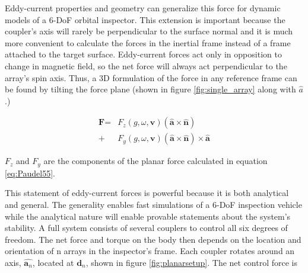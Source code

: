 \documentclass[letterpaper, 10 pt, conference]{ieeeconf}  %
\begin{document}
\par Eddy-current properties and geometry can generalize this force for dynamic models of a 6-DoF orbital inspector. This extension is important because the coupler's axis will rarely be perpendicular to the surface normal and it is much more convenient to calculate the forces in the inertial frame instead of a frame attached to the target surface. 
Eddy-current forces act only in opposition to change in magnetic field, so the net force will always act perpendicular to the array's spin axis. Thus, a 3D formulation of the force in any reference frame can be found by tilting the force plane (shown in figure \ref{fig:single_array} along with $\hat{a}$.) 


\begin{equation}
\label{eq:arrayForce}
\begin{split}
\textbf{F} =  &F_z(g,\omega,\textbf{v}) \left(\hat{\textbf{a}} \times \hat{\textbf{n}} \right) \\
			 + &F_y(g,\omega,\textbf{v}) \left(\hat{\textbf{a}} \times \hat{\textbf{n}} \right) \times \hat{\textbf{a}}
 \end{split}
 \end{equation}
 
 $F_z$ and $F_y$ are the components of the planar force calculated in equation \ref{eq:Paudel55}.
 \par This statement of eddy-current forces is powerful because it is both analytical and general. The generality enables fast simulations of a 6-DoF inspection vehicle while the analytical nature will enable provable statements about the system's stability.
A full system consists of several couplers to control all six degrees of freedom. The net force and torque on the body then depends on the location and orientation of n arrays in the inspector's frame. Each coupler
 rotates around an axis, $\hat{\textbf{a}_n}$, located at $\textbf{d}_n$, shown in figure \ref{fig:planarsetup}. The net control force is 
 
\end{document}
